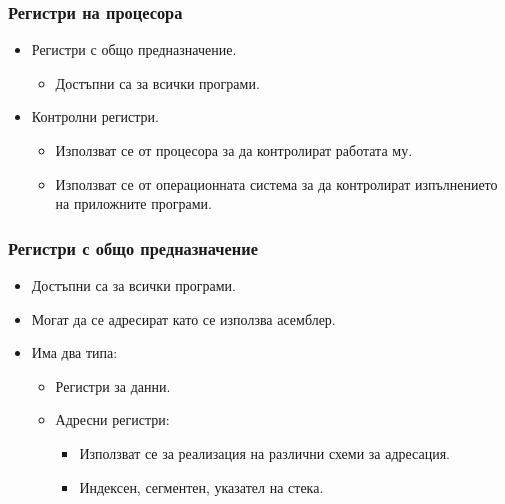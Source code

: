 \documentclass[ignorenonframetext, hyperref=unicode]{beamer}
\begin{document}
\begin{frame}
\frametitle{Регистри на процесора}
\begin{itemize}
\item Регистри с общо предназначение.
\begin{itemize}
  \item Достъпни са за всички програми.
\end{itemize}
\item Контролни регистри.
\begin{itemize}
  \item Използват се от процесора за да контролират работата му.
  \item Използват се от операционната система за да контролират изпълнението на
  приложните програми.
\end{itemize}
\end{itemize}
\end{frame}

\begin{frame}
\frametitle{Регистри с общо предназначение}
\begin{itemize}
\item Достъпни са за всички програми.
\item Могат да се адресират като се използва асемблер.
\item Има два типа:
\begin{itemize}
  \item Регистри за данни.
  \item Адресни регистри:
  \begin{itemize}
    \item Използват се за реализация на различни схеми за адресация.
    \item Индексен, сегментен, указател на стека.
  \end{itemize}
\end{itemize}
\end{itemize}
\end{frame}
\end{document}
